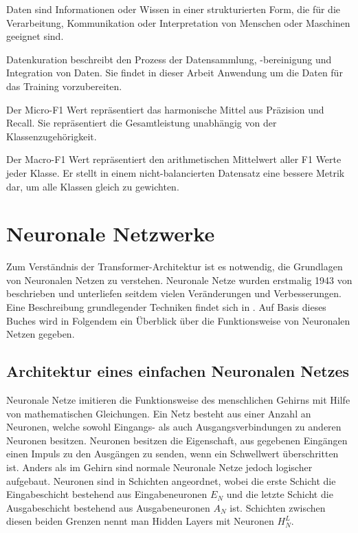 \begin{definition}[Daten]\label{def:daten}
    Daten sind Informationen oder Wissen in einer strukturierten Form, die für die Verarbeitung, Kommunikation oder Interpretation von Menschen oder Maschinen geeignet sind.
\end{definition}

\begin{definition}[Datenkuration]\label{def:datenkuration}
    Datenkuration beschreibt den Prozess der Datensammlung, -bereinigung und Integration von Daten. Sie findet in dieser Arbeit Anwendung um die Daten für das Training vorzubereiten.
\end{definition}

\begin{definition}[Micro-F1]\label{def:micro-f1}
    Der Micro-F1 Wert repräsentiert das harmonische Mittel aus Präzision und Recall.
    Sie repräsentiert die Gesamtleistung unabhängig von der Klassenzugehörigkeit.
\end{definition}

\begin{definition}[Macro-F1]\label{def:macro-f1}
    Der Macro-F1 Wert repräsentiert den arithmetischen Mittelwert aller F1 Werte jeder Klasse. Er stellt in einem nicht-balancierten Datensatz eine bessere Metrik dar, um alle Klassen gleich zu gewichten.
\end{definition}


\section{Neuronale Netzwerke}
Zum Verständnis der Transformer-Architektur ist es notwendig, die Grundlagen von Neuronalen Netzen zu verstehen.
Neuronale Netze wurden erstmalig 1943 von \citet{neuronal_networks_first} beschrieben und unterliefen seitdem vielen Veränderungen und Verbesserungen.
Eine Beschreibung grundlegender Techniken findet sich in \citet{neuronale-netze}. Auf Basis dieses Buches wird in Folgendem ein Überblick über die Funktionsweise von Neuronalen Netzen gegeben.\\

\subsection{Architektur eines einfachen Neuronalen Netzes}
Neuronale Netze imitieren die Funktionsweise des menschlichen Gehirns mit Hilfe von mathematischen Gleichungen.
Ein Netz besteht aus einer Anzahl an Neuronen, welche sowohl Eingangs- als auch Ausgangsverbindungen zu anderen Neuronen besitzen.
Neuronen besitzen die Eigenschaft, aus gegebenen Eingängen einen Impuls zu den Ausgängen zu senden, wenn ein Schwellwert überschritten ist.
Anders als im Gehirn sind normale Neuronale Netze jedoch logischer aufgebaut.
Neuronen sind in Schichten angeordnet, wobei die erste Schicht die Eingabeschicht bestehend aus Eingabeneuronen $E_N$ und die letzte Schicht die Ausgabeschicht bestehend aus Ausgabeneuronen $A_N$ ist.
Schichten zwischen diesen beiden Grenzen nennt man Hidden Layers mit Neuronen $H^L_N$.\\


